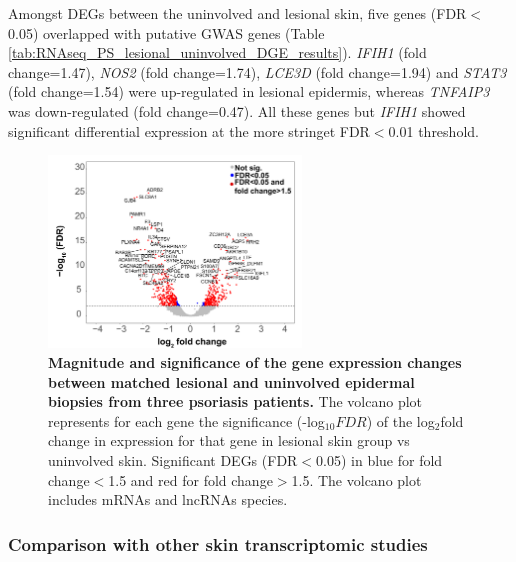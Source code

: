 Amongst DEGs between the uninvolved and lesional skin, five genes (FDR$<$0.05) overlapped with putative GWAS genes (Table \ref{tab:RNAseq_PS_lesional_uninvolved_DGE_results}). \textit{IFIH1} (fold change=1.47), \textit{NOS2} (fold change=1.74), \textit{LCE3D} (fold change=1.94) and \textit{STAT3} (fold change=1.54) were up-regulated in lesional epidermis, whereas \textit{TNFAIP3} was down-regulated (fold change=0.47). All these genes but \textit{IFIH1} showed significant differential expression at the more stringet FDR$<$0.01 threshold.

\begin{figure}[htbp]
\centering
\includegraphics[width=0.6\textwidth]{./Results2/pdfs/RNA_PS_lesional_uninvolved_volcano_plot}
\caption[Magnitude and significance of the gene expression changes between matched lesional and uninvolved epidermal biopsies from three psoriasis patients.]{\textbf{Magnitude and significance of the gene expression changes between matched lesional and uninvolved epidermal biopsies from three psoriasis patients.} The volcano plot represents for each gene the significance (-log$_{10}FDR$) of the log$_2$fold change in expression for that gene in lesional skin group vs uninvolved skin. Significant DEGs (FDR$<$0.05) in blue for fold change$<$1.5 and red for fold change$>$1.5. The volcano plot includes mRNAs and lncRNAs species.}
\label{figure:Skin_DGE_volcano_plot}
\end{figure}





\subsubsection{Comparison with other skin transcriptomic studies}


